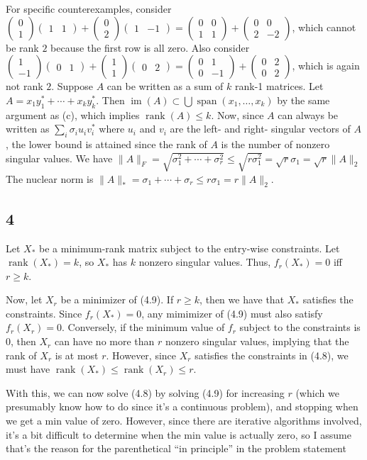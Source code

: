 \documentclass{article}
\newcommand{\openm}{\begin{pmatrix}}
\newcommand{\closem}{\end{pmatrix}}
\DeclareMathOperator{\rank}{rank}
\DeclareMathOperator{\im}{im}
\DeclareMathOperator{\Span}{span}
\begin{document}
For specific counterexamples, consider $\openm0\\1\closem\openm1&1\closem+\openm0\\2\closem\openm1&-1\closem=\openm0&0\\1&1\closem+\openm0&0\\2&-2\closem$, which cannot be rank $2$ because the first row is all zero. Also consider $\openm1\\-1\closem\openm0&1\closem+\openm1\\1\closem\openm0&2\closem=\openm0&1\\0&-1\closem+\openm0&2\\0&2\closem$, which is again not rank $2$.
Suppose $A$ can be written as a sum of $k$ rank-1 matrices. Let $A=x_1y_1^*+\cdots+x_ky_k^*$. Then $\im(A)\subset\bigcup\Span(x_1,\ldots,x_k)$ by the same argument as (c), which implies $\rank(A)\leq k$. Now, since $A$ can always be written as $\sum_i\sigma_iu_iv_i^*$ where $u_i$ and $v_i$ are the left- and right- singular vectors of $A$, the lower bound is attained since the rank of $A$ is the number of nonzero singular values.
We have $\|A\|_F=\sqrt{\sigma_1^2+\cdots+\sigma_r^2}\leq\sqrt{r\sigma_1^2}=\sqrt{r}\sigma_1=\sqrt{r}\|A\|_2$
The nuclear norm is $\|A\|_*=\sigma_1+\cdots+\sigma_r\leq r\sigma_1=r\|A\|_2$.
\subsection*{4}
Let $X_*$ be a minimum-rank matrix subject to the entry-wise constraints. Let $\rank(X_*)=k$, so $X_*$ has $k$ nonzero singular values. Thus, $f_r(X_*)=0$ iff $r\geq k$. 

Now, let $X_r$ be a minimizer of (4.9). If $r\geq k$, then we have that $X_*$ satisfies the constraints. Since $f_r(X_*)=0$, any mimimizer of (4.9) must also satisfy $f_r(X_r)=0$. Conversely, if the minimum value of $f_r$ subject to the constraints is $0$, then $X_r$ can have no more than $r$ nonzero singular values, implying that the rank of $X_r$ is at most $r$. However, since $X_r$ satisfies the constraints in (4.8), we must have $\rank(X_*)\leq\rank(X_r)\leq r$.

With this, we can now solve (4.8) by solving (4.9) for increasing $r$ (which we presumably know how to do since it's a continuous problem), and stopping when we get a min value of zero. However, since there are iterative algorithms involved, it's a bit difficult to determine when the min value is actually zero, so I assume that's the reason for the parenthetical ``in principle'' in the problem statement
\end{document}
